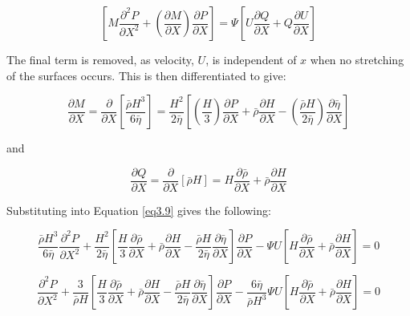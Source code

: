 \begin{equation}\label{eq3.9}
	\left[M \frac{\partial^{2} P}{\partial X^{2}}+\left(\frac{\partial M}{\partial X}\right) \frac{\partial P}{\partial X}\right]=\Psi\left[U \frac{\partial Q}{\partial X}+Q \frac{\partial U}{\partial X}\right]
\end{equation}

The final term is removed, as velocity, $U$, is independent of $x$ when no stretching of the surfaces occurs. This is then differentiated to give:

\begin{equation}\label{eq3.10}
	\frac{\partial M}{\partial X}=\frac{\partial}{\partial X}\left[\frac{\bar{\rho} H^{3}}{6 \bar{\eta}}\right]=\frac{H^{2}}{2 \bar{\eta}}\left[\left(\frac{H}{3}\right) \frac{\partial P}{\partial X}+\bar{\rho} \frac{\partial H}{\partial X}-\left(\frac{\bar{\rho} H}{2 \bar{\eta}}\right) \frac{\partial \bar{\eta}}{\partial X}\right]
\end{equation}

and

\begin{equation}\label{eq3.11}
	\frac{\partial Q}{\partial X}=\frac{\partial}{\partial X}[\bar{\rho} H]=H \frac{\partial \bar{\rho}}{\partial X}+\bar{\rho} \frac{\partial H}{\partial X}
\end{equation}

Substituting into Equation \ref{eq3.9} gives the following:

\begin{equation}\label{eq1.12}
	\frac{\bar{\rho} H^{3}}{6 \bar{\eta}} \frac{\partial^{2} P}{\partial X^{2}}+\frac{H^{2}}{2 \bar{\eta}}\left[\frac{H}{3} \frac{\partial \bar{\rho}}{\partial X}+\bar{\rho} \frac{\partial H}{\partial X}-\frac{\bar{\rho} H}{2 \bar{\eta}} \frac{\partial \bar{\eta}}{\partial X}\right] \frac{\partial P}{\partial X}-\Psi U\left[H \frac{\partial \bar{\rho}}{\partial X}+\bar{\rho} \frac{\partial H}{\partial X}\right]=0
\end{equation}

\begin{equation}\label{eq3.13}
	\frac{\partial^{2} P}{\partial X^{2}}+\frac{3}{\bar{\rho} H}\left[\frac{H}{3} \frac{\partial \bar{\rho}}{\partial X}+\bar{\rho} \frac{\partial H}{\partial X}-\frac{\bar{\rho} H}{2 \bar{\eta}} \frac{\partial \bar{\eta}}{\partial X}\right] \frac{\partial P}{\partial X}-\frac{6 \bar{\eta}}{\bar{\rho} H^{3}} \Psi U\left[H \frac{\partial \bar{\rho}}{\partial X}+\bar{\rho} \frac{\partial H}{\partial X}\right]=0
\end{equation}

